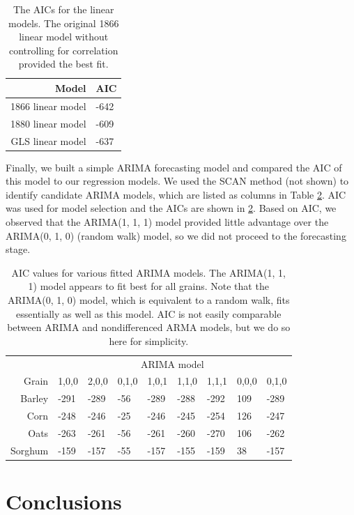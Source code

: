\documentclass[11pt]{article}
\begin{document}
\begin{table}
	\centering
		\begin{tabular}{rl}
		\toprule
		Model & AIC \\
		\midrule
		1866 linear model & -642 \\
		1880 linear model & -609 \\
		GLS linear model  & -637 \\
		\bottomrule
	\end{tabular}
	\caption{The AICs for the linear models. The original 1866 linear model
	without controlling for correlation provided the best fit.}
	\label{tab:AIC}
\end{table}

Finally, we built a simple ARIMA forecasting model and compared the AIC of this
model to our regression models. We used the SCAN method (not shown) to identify
candidate ARIMA models, which are listed as columns in Table \ref{tab:ARIMA}.
AIC was used for model selection and the AICs are shown in \ref{tab:ARIMA}.
Based on AIC, we observed that the ARIMA(1, 1, 1) model provided little
advantage over the ARIMA(0, 1, 0) (random walk) model, so we did not proceed to
the forecasting stage.

\begin{table}[h!]
	\centering
	\begin{tabular}{rllllllll}
		\toprule
		      & \multicolumn{8}{c}{ARIMA model} \\
		        \cmidrule{2-9}
		Grain & 1,0,0 & 2,0,0 & 0,1,0 & 1,0,1 & 1,1,0 & 1,1,1 & 0,0,0 & 0,1,0 \\
		\midrule
		Barley  & -291 & -289 & -56 & -289 & -288 & -292 & 109 & -289 \\
		Corn    & -248 & -246 & -25 & -246 & -245 & -254 & 126 & -247 \\
		Oats    & -263 & -261 & -56 & -261 & -260 & -270 & 106 & -262 \\
		Sorghum & -159 & -157 & -55 & -157 & -155 & -159 &  38 & -157 \\
		\bottomrule
	\end{tabular}
	\caption{AIC values for various fitted ARIMA models. The ARIMA(1, 1, 1)
	model appears to fit best for all grains. Note 	that the ARIMA(0, 1, 0)
	model, which is equivalent to a random walk, fits essentially as well as
	this model. AIC is not easily comparable between ARIMA and nondifferenced
	ARMA models, but we do so here for simplicity.}
	\label{tab:ARIMA}
\end{table}

\section*{Conclusions}
\end{document}
